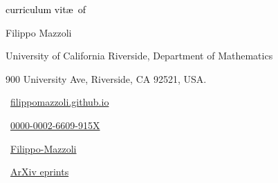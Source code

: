 \begin{scriptsize}
	 \textcolor{black}{curriculum vit\ae~of}
\end{scriptsize}

\begin{Large} 
	Filippo Mazzoli
\end{Large}

\vspace*{0.4em}
\begin{scshape}
	\begin{scriptsize}
		  \textcolor{highlight2}{University of California Riverside, Department of Mathematics}
		  
		  \vspace*{-1ex}
		  \textcolor{highlight2}{900 University Ave, Riverside, CA 92521, USA.}
	\end{scriptsize}
\end{scshape}
\vspace*{0.25cm}

\begin{footnotesize}
	\begin{tiny}\faHome\end{tiny}~\href{https://filippomazzoli.github.io}
	{filippomazzoli.github.io
	}
	\quad {} 
	
	
	\begin{tiny}\aiOrcid\end{tiny}~\href{https://orcid.org/0000-0002-6609-915X}{0000-0002-6609-915X}
	\quad 
	\begin{tiny}\aiResearchGate\end{tiny}~\href{https://www.researchgate.net/profile/Filippo-Mazzoli}{Filippo-Mazzoli}
		\quad
	\begin{tiny}\aiarXiv\end{tiny}~\href{https://arxiv.org/a/0000-0002-6609-915X.html}{ArXiv eprints}
	

\end{footnotesize}